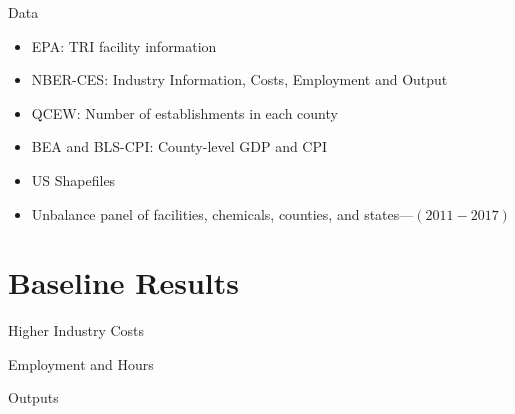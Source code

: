 \documentclass[aspectratio = 169]{beamer}
\begin{document}
    \begin{frame}{Data}
        \begin{itemize}
            \item EPA: TRI facility information
            \item NBER-CES: Industry Information, Costs, Employment and Output
            \item QCEW: Number of establishments in each county
            \item BEA and BLS-CPI: County-level GDP and CPI
            \item US Shapefiles
            \item Unbalance panel of facilities, chemicals, counties, and states---$(2011-2017)$
        \end{itemize}
        \hypertarget{Summary Table}{}
        \hyperlink{tab:summary-table}{}
        \hypertarget{Balance Test Counties}{}
        \hyperlink{tab:balance-test-counties}{}
        \hypertarget{Balance Test States}{}
        \hyperlink{tab:balance-test-states}{}
    \end{frame}


    \section{Baseline Results}\label{sec:baseline-results}
    \begin{frame}[shrink = 30]{Higher Industry Costs}
        
        \hypertarget{Industry Costs}{}
        \hyperlink{tab:baseline-costs}{}
    \end{frame}

    \begin{frame}[shrink = 30]{Employment and Hours}
        
        \hypertarget{Employment and Hours}{}
        \hyperlink{tab:baseline-employment-hours}{}
        \hypertarget{Cross-County Worker Mobility}{}
        \hyperlink{tab:baseline-worker-mobility}{}
    \end{frame}

    \begin{frame}[shrink = 30]{Outputs}
        
        \hypertarget{Outputs}{}
        \hyperlink{tab:baseline-outputs}{}
    \end{frame}
\end{document}
